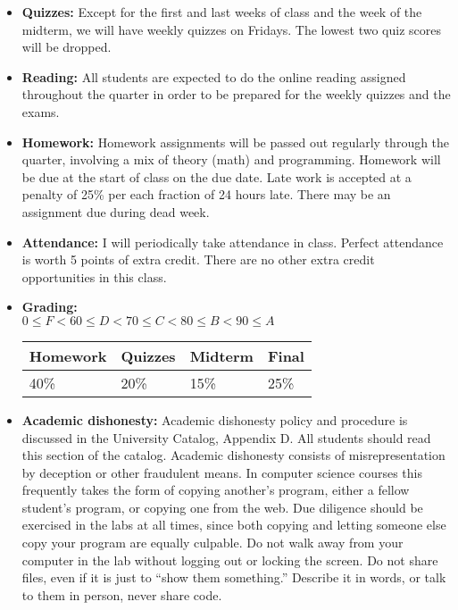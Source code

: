 \documentclass{article}
\begin{document}
\begin{itemize}
\item {\bf Quizzes:} Except for the first and last weeks of class and
  the week of the midterm, we will have weekly quizzes on Fridays.  The
  lowest two quiz scores will be dropped.

\item {\bf Reading:} All students are expected to do the online
  reading assigned throughout the quarter in order to be prepared for
  the weekly quizzes and the exams.

\item {\bf Homework:}  Homework assignments will be passed out
  regularly through the quarter, involving a mix of theory (math) and
  programming.   Homework will be due at the start of
  class on the due date.  Late work is accepted at a penalty
  of 25\% per each fraction of 24 hours late.  There may be an assignment
  due during dead week.

\item {\bf Attendance:}  I will periodically take attendance in
  class.  Perfect attendance is worth 5 points of extra credit.  There
  are no other extra credit opportunities in this class.

\item {\bf Grading:} \\
$0\leq F < 60 \leq D < 70 \leq C < 80 \leq B < 90 \leq A$\hfill
\begin{tabular}{|l|l|l|l|}\hline
Homework & Quizzes & Midterm & Final\\\hline
40\% & 20\% & 15\% & 25\%\\\hline
\end{tabular}

\item {\bf Academic dishonesty:} Academic dishonesty policy and
  procedure is discussed in the University Catalog, Appendix D.  All
  students should read this section of the catalog.  Academic
  dishonesty consists of misrepresentation by deception or other
  fraudulent means.  In computer science courses this frequently takes
  the form of copying another's program, either a fellow student's
  program, or copying one from the web.  Due diligence should be
  exercised in the labs at all times, since both copying and letting
  someone else copy your program are equally culpable.  Do not walk
  away from your computer in the lab without logging out or locking
  the screen.  Do not share files, even if it is just to ``show them
  something.''  Describe it in words, or talk to them in person, never
  share code.


\end{itemize}
\end{document}
